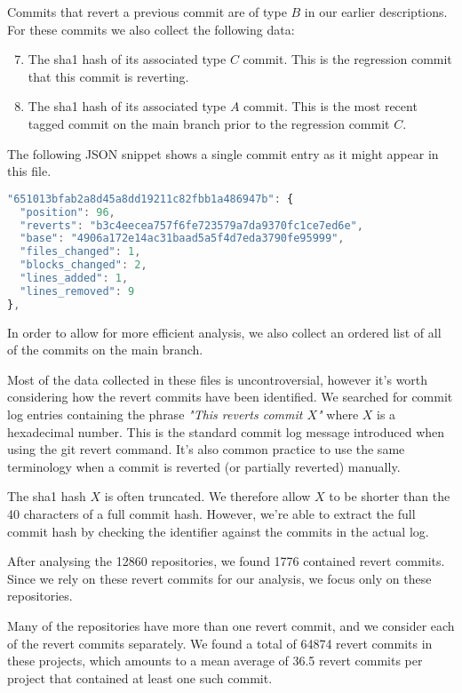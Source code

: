\documentclass[10pt,journal,compsoc]{IEEEtran}
\begin{document}
Commits that revert a previous commit are of type $B$ in our earlier descriptions. For these commits we also collect the following data:

\begin{enumerate}
\setcounter{enumi}{6}
\item The sha1 hash of its associated type $C$ commit. This is the regression commit that this commit is reverting.
\item The sha1 hash of its associated type $A$ commit. This is the most recent tagged commit on the main branch prior to the regression commit $C$. 
\end{enumerate}

The following JSON snippet shows a single commit entry as it might appear in this file.

\begin{lstlisting}[language=JavaScript]
"651013bfab2a8d45a8dd19211c82fbb1a486947b": {
  "position": 96,
  "reverts": "b3c4eecea757f6fe723579a7da9370fc1ce7ed6e",
  "base": "4906a172e14ac31baad5a5f4d7eda3790fe95999",
  "files_changed": 1,
  "blocks_changed": 2,
  "lines_added": 1,
  "lines_removed": 9
},
\end{lstlisting}

In order to allow for more efficient analysis, we also collect an ordered list of all of the commits on the main branch. 

Most of the data collected in these files is uncontroversial, however it's worth considering how the revert commits have been identified. We searched for commit log entries containing the phrase {\it"This reverts commit $X$"\/} where $X$ is a hexadecimal number. This is the standard commit log message introduced when using the {\code git revert} command. It's also common practice to use the same terminology when a commit is reverted (or partially reverted) manually.

The sha1 hash $X$ is often truncated. We therefore allow $X$ to be shorter than the 40 characters of a full commit hash. However, we're able to extract the full commit hash by checking the identifier against the commits in the actual log.

After analysing the 12860 repositories, we found 1776 contained revert commits. Since we rely on these revert commits for our analysis, we focus only on these repositories.

Many of the repositories have more than one revert commit, and we consider each of the revert commits separately. We found a total of 64874 revert commits in these projects, which amounts to a mean average of 36.5 revert commits per project that contained at least one such commit.
\end{document}
